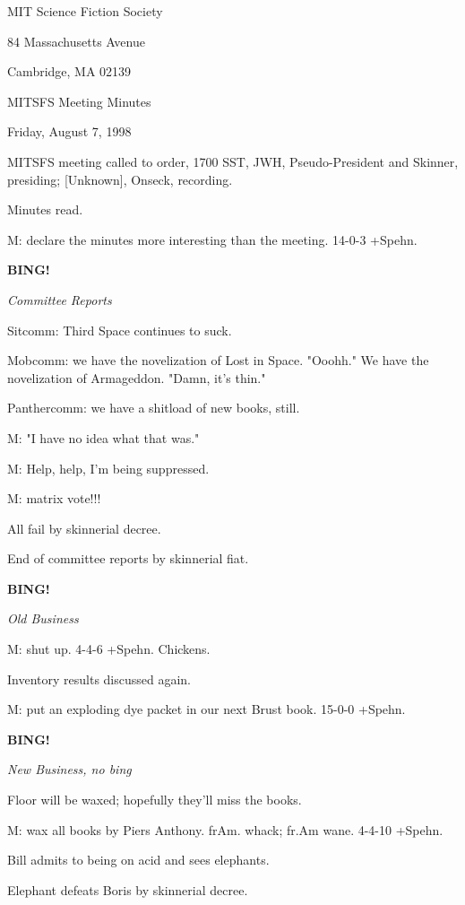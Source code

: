 \documentclass[12pt]{article}
\newcommand{\bing}{{\bf BING!} }
\newcommand{\goto}[1]{\bing \vskip 12pt \centerline{{\em{#1}}}}
\begin{document}
\begin{center}

MIT Science Fiction Society 

84 Massachusetts Avenue

Cambridge, MA 02139

\vspace{12pt}

MITSFS Meeting Minutes 

Friday, August 7, 1998

\end{center}
 
\vspace{18pt}

\setlength{\parskip}{6pt}

\noindent
MITSFS meeting called to order, 1700 SST,
JWH, Pseudo-President and Skinner, presiding; [Unknown], Onseck, recording.

Minutes read.

M: declare the minutes more interesting than the meeting. 14-0-3 +Spehn.

\goto{Committee Reports}

Sitcomm: Third Space continues to suck.

Mobcomm: we have the novelization of Lost in Space. "Ooohh." We have the novelization of Armageddon. "Damn, it's thin."

Panthercomm: we have a shitload of new books, still.

M: "I have no idea what that was."

M: Help, help, I'm being suppressed.

M: matrix vote!!!

All fail by skinnerial decree.

End of committee reports by skinnerial fiat.

\goto{Old Business}

M: shut up. 4-4-6 +Spehn. Chickens.

Inventory results discussed again.

M: put an exploding dye packet in our next Brust book. 15-0-0 +Spehn.

\goto{New Business, no bing}

Floor will be waxed; hopefully they'll miss the books.

M: wax all books by Piers Anthony. frAm. whack; fr.Am wane. 4-4-10 +Spehn.

Bill admits to being on acid and sees elephants.

Elephant defeats Boris by skinnerial decree.
\end{document}
